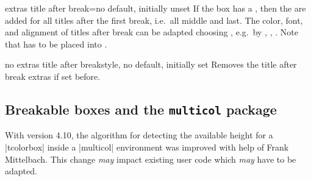 \begin{docTcbKey}[][doc new=2018-07-26]{extras title after break}{=}{no default, initially unset}
  If the box has a , then the 
  are added for all titles after the first break, i.e.\ all middle and last.
  The color, font, and alignment of titles after break can be adapted choosing
  , e.g.\ by , ,
  .
  Note that  has to be placed into
  .
\end{docTcbKey}

\begin{docTcbKey}[][doc new=2018-07-26]{no extras title after break}{}{style, no default, initially set}
  Removes the title after break extras if set before.
\end{docTcbKey}

\bigskip





\clearpage
\subsection{Breakable boxes and the \texttt{multicol} package}\label{subsec:multicol}
\begin{marker}
With version 4.10, the algorithm for detecting the available height
for a |tcolorbox| inside a |multicol| environment was improved with help
of Frank Mittelbach. This change \emph{may} impact existing user
code which \emph{may} have to be adapted.
\end{marker}


